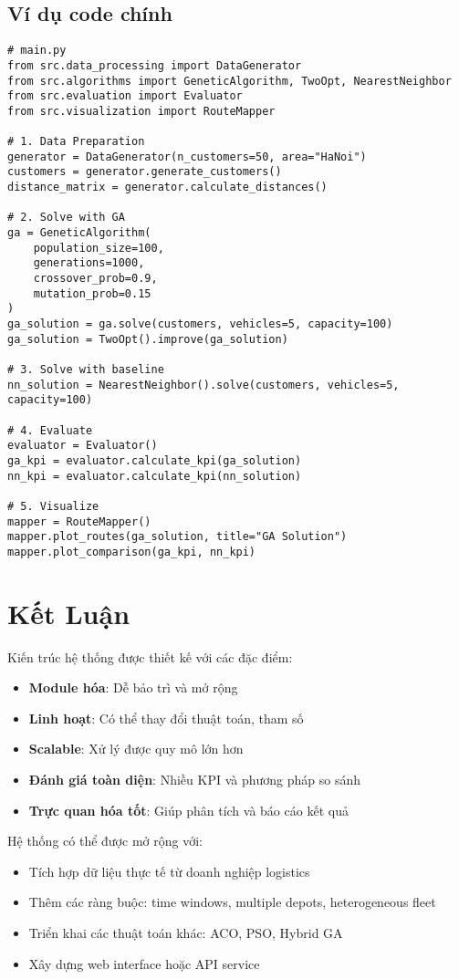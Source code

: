 \documentclass[12pt,a4paper]{article}
\begin{document}
\subsection{Ví dụ code chính}

\begin{verbatim}
# main.py
from src.data_processing import DataGenerator
from src.algorithms import GeneticAlgorithm, TwoOpt, NearestNeighbor
from src.evaluation import Evaluator
from src.visualization import RouteMapper

# 1. Data Preparation
generator = DataGenerator(n_customers=50, area="HaNoi")
customers = generator.generate_customers()
distance_matrix = generator.calculate_distances()

# 2. Solve with GA
ga = GeneticAlgorithm(
    population_size=100,
    generations=1000,
    crossover_prob=0.9,
    mutation_prob=0.15
)
ga_solution = ga.solve(customers, vehicles=5, capacity=100)
ga_solution = TwoOpt().improve(ga_solution)

# 3. Solve with baseline
nn_solution = NearestNeighbor().solve(customers, vehicles=5, capacity=100)

# 4. Evaluate
evaluator = Evaluator()
ga_kpi = evaluator.calculate_kpi(ga_solution)
nn_kpi = evaluator.calculate_kpi(nn_solution)

# 5. Visualize
mapper = RouteMapper()
mapper.plot_routes(ga_solution, title="GA Solution")
mapper.plot_comparison(ga_kpi, nn_kpi)
\end{verbatim}

\section{Kết Luận}

Kiến trúc hệ thống được thiết kế với các đặc điểm:
\begin{itemize}
    \item \textbf{Module hóa}: Dễ bảo trì và mở rộng
    \item \textbf{Linh hoạt}: Có thể thay đổi thuật toán, tham số
    \item \textbf{Scalable}: Xử lý được quy mô lớn hơn
    \item \textbf{Đánh giá toàn diện}: Nhiều KPI và phương pháp so sánh
    \item \textbf{Trực quan hóa tốt}: Giúp phân tích và báo cáo kết quả
\end{itemize}

Hệ thống có thể được mở rộng với:
\begin{itemize}
    \item Tích hợp dữ liệu thực tế từ doanh nghiệp logistics
    \item Thêm các ràng buộc: time windows, multiple depots, heterogeneous fleet
    \item Triển khai các thuật toán khác: ACO, PSO, Hybrid GA
    \item Xây dựng web interface hoặc API service
\end{itemize}
\end{document}
